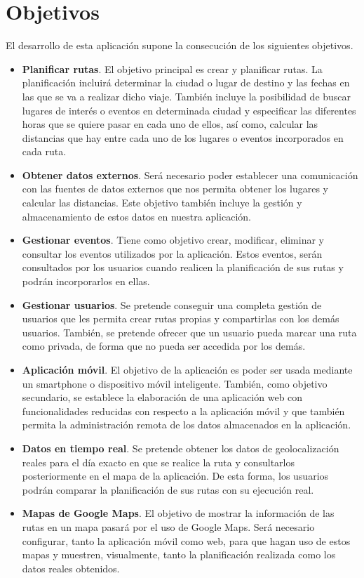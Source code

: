 \section{Objetivos}
El desarrollo de esta aplicación supone la consecución de los siguientes objetivos.

\begin{itemize}

	\item \textbf{Planificar rutas}. El objetivo principal es crear y planificar rutas. La planificación incluirá determinar la ciudad o lugar de destino y las fechas en las que se va a realizar dicho viaje. También incluye la posibilidad de buscar lugares de interés o eventos en determinada ciudad y especificar las diferentes horas que se quiere pasar en cada uno de ellos, así como, calcular las distancias que hay entre cada uno de los lugares o eventos incorporados en cada ruta.
	\item \textbf{Obtener datos externos}. Será necesario poder establecer una comunicación con las fuentes de datos externos que nos permita obtener los lugares y calcular las distancias. Este objetivo también incluye la gestión y almacenamiento de estos datos en nuestra aplicación.
	\item \textbf{Gestionar eventos}. Tiene como objetivo crear, modificar, eliminar y consultar los eventos utilizados por la aplicación. Estos eventos, serán consultados por los usuarios cuando realicen la planificación de sus rutas y podrán incorporarlos en ellas.
	\item \textbf{Gestionar usuarios}. Se pretende conseguir una completa gestión de usuarios que les permita crear rutas propias y compartirlas con los demás usuarios. También, se pretende ofrecer que un usuario pueda marcar una ruta como privada, de forma que no pueda ser accedida por los demás.
	\item \textbf{Aplicación móvil}. El objetivo de la aplicación es poder ser usada mediante un smartphone o dispositivo móvil inteligente. También, como objetivo secundario, se establece la elaboración de una aplicación web con funcionalidades reducidas con respecto a la aplicación móvil y que también permita la administración remota de los datos almacenados en la aplicación.
	\item \textbf{Datos en tiempo real}. Se pretende obtener los datos de geolocalización reales para el día exacto en que se realice la ruta y consultarlos posteriormente en el mapa de la aplicación. De esta forma, los usuarios podrán comparar la planificación de sus rutas con su ejecución real.
	\item \textbf{Mapas de Google Maps}. El objetivo de mostrar la información de las rutas en un mapa pasará por el uso de Google Maps. Será necesario configurar, tanto la aplicación móvil como web, para que hagan uso de estos mapas y muestren, visualmente, tanto la planificación realizada como los datos reales obtenidos.
	
\end{itemize}


